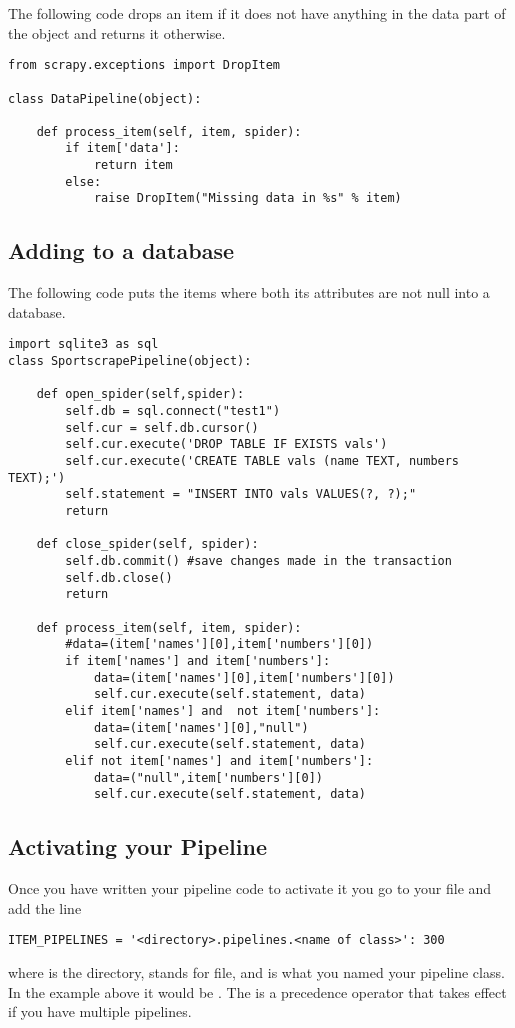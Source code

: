 {The following code drops an item if it does not have anything in the data part of the object and returns it otherwise.

\begin{lstlisting}
from scrapy.exceptions import DropItem

class DataPipeline(object):

    def process_item(self, item, spider):
        if item['data']:
            return item
        else:
            raise DropItem("Missing data in %s" % item)
\end{lstlisting}

\subsection*{Adding to a database}
The following code puts the items where both its attributes are not null into a database. 
\begin{lstlisting}
import sqlite3 as sql
class SportscrapePipeline(object):
	
	def open_spider(self,spider):
		self.db = sql.connect("test1")
		self.cur = self.db.cursor()
		self.cur.execute('DROP TABLE IF EXISTS vals')
		self.cur.execute('CREATE TABLE vals (name TEXT, numbers TEXT);')
		self.statement = "INSERT INTO vals VALUES(?, ?);"
		return

	def close_spider(self, spider):
		self.db.commit() #save changes made in the transaction
		self.db.close()
		return

	def process_item(self, item, spider):
		#data=(item['names'][0],item['numbers'][0])
		if item['names'] and item['numbers']:
			data=(item['names'][0],item['numbers'][0])
			self.cur.execute(self.statement, data)
		elif item['names'] and  not item['numbers']:
			data=(item['names'][0],"null")
			self.cur.execute(self.statement, data)
		elif not item['names'] and item['numbers']:
			data=("null",item['numbers'][0])
			self.cur.execute(self.statement, data)
\end{lstlisting}

\subsection*{Activating your Pipeline}
Once you have written your pipeline code to activate it you go to your  file and add the line
\begin{lstlisting}
ITEM_PIPELINES = '<directory>.pipelines.<name of class>': 300
\end{lstlisting}
where  is the directory,  stands for  file, and  is what you named your pipeline class. In the example above it would be . The  is a precedence operator that takes effect if you have multiple pipelines.

}
